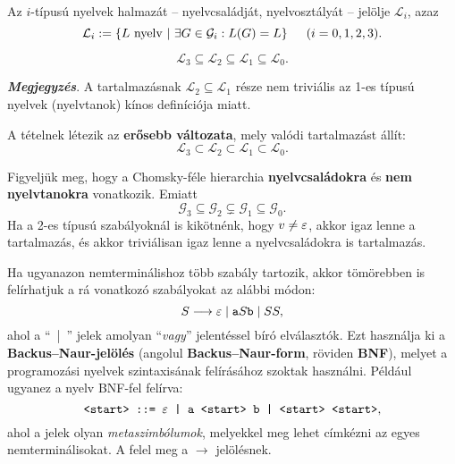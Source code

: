 Az $i$-típusú nyelvek halmazát -- nyelvcsaládját, nyelvosztályát -- jelölje $\mathcal{L}_i$, azaz
\[ \mathcal{L}_i := \left\{ L \text{ nyelv} ~ \middle\vert ~ \exists G  \in \mathcal{G}_i : L(G) = L \right\} ~~~~ (i = 0, 1, 2, 3). \]

\begin{tcolorbox}
	\begin{theorem}
		\[ \mathcal{L}_3 \subseteq \mathcal{L}_2 \subseteq \mathcal{L}_1 \subseteq \mathcal{L}_0. \]
		\begin{center}
		\end{center}
	\end{theorem}
\end{tcolorbox}

\textit{\textbf{Megjegyzés}}. A tartalmazásnak $\mathcal{L}_2 \subseteq \mathcal{L}_1$ része nem triviális az 1-es típusú nyelvek (nyelvtanok) kínos definíciója miatt.

A tételnek létezik az \textbf{erősebb változata}, mely valódi tartalmazást állít:
\[ \mathcal{L}_3 \subset \mathcal{L}_2 \subset \mathcal{L}_1 \subset \mathcal{L}_0. \]

Figyeljük meg, hogy a Chomsky-féle hierarchia \textbf{nyelvcsaládokra} és \textbf{nem nyelvtanokra} vonatkozik. Emiatt
\[ \mathcal{G}_3 \subseteq \mathcal{G}_2 \subsetneq \mathcal{G}_1 \subseteq \mathcal{G}_0. \]
Ha a 2-es típusú szabályoknál is kikötnénk, hogy $v \neq \varepsilon$, akkor igaz lenne a tartalmazás, és akkor triviálisan igaz lenne a nyelvcsaládokra is tartalmazás.

Ha ugyanazon nemterminálishoz több szabály tartozik, akkor tömörebben is felírhatjuk a rá vonatkozó szabályokat az alábbi módon:
\[ S \longrightarrow \varepsilon \mid \texttt{a}S\texttt{b} \mid SS, \]
ahol a ``~|~'' jelek amolyan ``\textit{vagy}'' jelentéssel bíró elválasztók. Ezt használja ki a \textbf{Backus--Naur-jelölés} (angolul \textbf{Backus--Naur-form}, röviden \textbf{BNF}), melyet a programozási nyelvek szintaxisának felírásához szoktak használni. Például ugyanez a nyelv BNF-fel felírva:
\[ \texttt{<start> ::= $\varepsilon$ | a <start> b | <start> <start>}, \]
ahol a \fbox{\texttt{<}, \texttt{>}} jelek olyan \textit{metaszimbólumok}, melyekkel meg lehet címkézni az egyes nemterminálisokat. A \fbox{\texttt{::=}} felel meg a $\longrightarrow$ jelölésnek.

